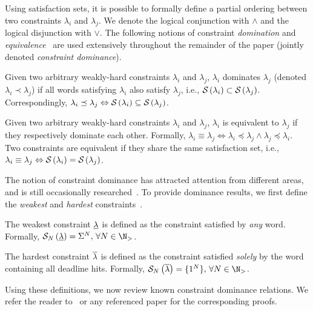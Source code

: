 Using satisfaction sets, it is possible to formally define a partial ordering between two constraints $\lambda_i$ and $\lambda_j$.
We denote the logical conjunction with $\land$ and the logical disjunction with $\lor$.
The following notions of constraint \emph{domination} and \emph{equivalence}~\cite{Bernat:2001, Bernat:1998} are used extensively throughout the remainder of the paper (jointly denoted \emph{constraint dominance}).
%
\begin{definition}%
\label{def:domination}%
    Given two arbitrary weakly-hard constraints $\lambda_i$ and $\lambda_j$, $\lambda_i$ dominates $\lambda_j$ (denoted $\lambda_i \prec \lambda_j$) if all words satisfying $\lambda_i$ also satisfy $\lambda_j$, i.e., $\mathcal{S}_{}\left( \lambda_i \right) \subset \mathcal{S}_{}\left( \lambda_j \right)$.
    Correspondingly, $\lambda_i \preceq \lambda_j \Leftrightarrow \mathcal{S}_{}\left( \lambda_i \right) \subseteq \mathcal{S}_{}\left( \lambda_j \right)$.
\end{definition}
%
\begin{definition}%
\label{def:equivalence}%
    Given two arbitrary weakly-hard constraints $\lambda_i$ and $\lambda_j$, $\lambda_i$ is equivalent to $\lambda_j$ if they respectively dominate each other.
    Formally, $\lambda_i \equiv \lambda_j \Leftrightarrow \lambda_i \preceq \lambda_j \land \lambda_j \preceq \lambda_i$. Two constraints are equivalent if they share the same satisfaction set, i.e., $\lambda_i \equiv \lambda_j \Leftrightarrow \mathcal{S}_{}\left( \lambda_i \right) = \mathcal{S}_{}\left( \lambda_j \right)$.
\end{definition}

The notion of constraint dominance has attracted attention from different areas, and is still occasionally researched~\cite{Wu:2020, Tu:2007}.
To provide dominance results, we first define the \emph{weakest} and \emph{hardest} constraints~\cite{Bernat:2001, Bernat:1998}.
%
\begin{definition}%
\label{def:weakest}%
    The weakest constraint $\underline{\lambda}$ is defined as the constraint satisfied by \emph{any} word.
    Formally, $\sset{N}{\lweak} = \Sigma^N,\,\forall N \in \N_{>}$.
\end{definition}
%
\begin{definition}%
\label{def:hardest}%
    The hardest constraint $\overline{\lambda}$ is defined as the constraint satisfied \emph{solely} by the word containing all deadline hits.
    Formally, $\sset{N}{\lhard} = \{ 1^N \},\,\forall N \in \N_{>}$.
\end{definition}
Using these definitions, we now review known constraint dominance relations.
We refer the reader to~\cite{Bernat:1998} or any referenced paper for the corresponding proofs.

